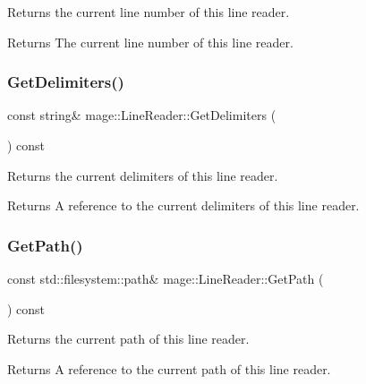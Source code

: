 Returns the current line number of this line reader.

\begin{DoxyReturn}{Returns}
The current line number of this line reader. 
\end{DoxyReturn}
\mbox{\label{classmage_1_1_line_reader_aa00e1e27b614e11ec9f70e52d0bac551}} 
\subsubsection{\texorpdfstring{Get\+Delimiters()}{GetDelimiters()}}
{\footnotesize\ttfamily const string\& mage\+::\+Line\+Reader\+::\+Get\+Delimiters (\begin{DoxyParamCaption}{ }\end{DoxyParamCaption}) const\hspace{0.3cm}{\ttfamily [noexcept]}}

Returns the current delimiters of this line reader.

\begin{DoxyReturn}{Returns}
A reference to the current delimiters of this line reader. 
\end{DoxyReturn}
\mbox{\label{classmage_1_1_line_reader_a9740b3cecdcf5a27c696a08eef3b09da}} 
\subsubsection{\texorpdfstring{Get\+Path()}{GetPath()}}
{\footnotesize\ttfamily const std\+::filesystem\+::path\& mage\+::\+Line\+Reader\+::\+Get\+Path (\begin{DoxyParamCaption}{ }\end{DoxyParamCaption}) const\hspace{0.3cm}{\ttfamily [noexcept]}}

Returns the current path of this line reader.

\begin{DoxyReturn}{Returns}
A reference to the current path of this line reader. 
\end{DoxyReturn}
\mbox{\label{classmage_1_1_line_reader_a2247078d0b5602f9a9a6b74019832faf}} 
